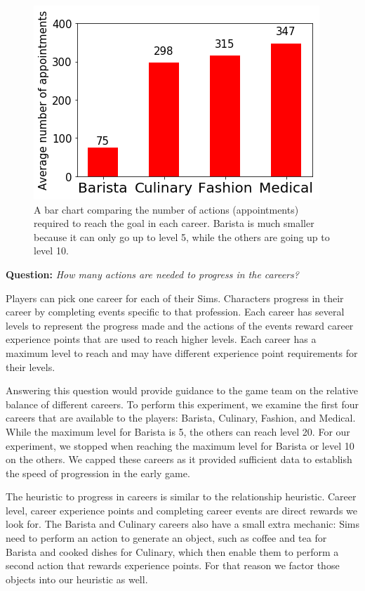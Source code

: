 \documentclass[letterpaper]{article} %
\begin{document}
\begin{figure}[th]
  \centering
  \includegraphics[width=1.0\linewidth]{images/4_careers.png}
  \caption{A bar chart comparing the number of actions (appointments) required to reach the goal in each career. Barista is much smaller because it can only go up to level 5, while the others are going up to level 10.}
  \label{Figure:4_career_bar_chart}
\end{figure}

\textbf{Question:} {\em How many actions are needed to progress in the careers?}

Players can pick one career for each of their Sims. Characters progress in their career by completing events specific to that profession. Each career has several levels to represent the progress made and the actions of the events reward career experience points that are used to reach higher levels. Each career has a maximum level to reach and may have different experience point requirements for their levels.

Answering this question would provide guidance to the game team on the relative balance of different careers. To perform this experiment, we examine the first four careers that are available to the players: Barista, Culinary, Fashion, and Medical. While the maximum level for Barista is 5, the others can reach level 20. For our experiment, we stopped when reaching the maximum level for Barista or level 10 on the others. We capped these careers as it provided sufficient data to establish the speed of progression in the early game.

The heuristic to progress in careers is similar to the relationship heuristic. Career level, career experience points and completing career events are direct rewards we look for. The Barista and Culinary careers also have a small extra mechanic: Sims need to perform an action to generate an object, such as coffee and tea for Barista and cooked dishes for Culinary, which then enable them to perform a second action that rewards experience points. For that reason we factor those objects into our heuristic as well.
\end{document}
